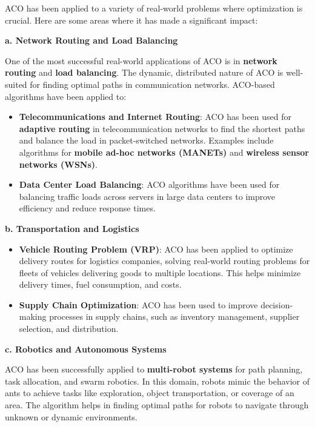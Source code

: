 \documentclass[
]{article}
\begin{document}
ACO has been applied to a variety of real-world problems where
optimization is crucial. Here are some areas where it has made a
significant impact:

\textbf{a. Network Routing and Load Balancing}

One of the most successful real-world applications of ACO is in
\textbf{network routing} and \textbf{load balancing}. The dynamic,
distributed nature of ACO is well-suited for finding optimal paths in
communication networks. ACO-based algorithms have been applied to:

\begin{itemize}
\item
  \textbf{Telecommunications and Internet Routing}: ACO has been used
  for \textbf{adaptive routing} in telecommunication networks to find
  the shortest paths and balance the load in packet-switched networks.
  Examples include algorithms for \textbf{mobile ad-hoc networks
  (MANETs)} and \textbf{wireless sensor networks (WSNs)}.
\item
  \textbf{Data Center Load Balancing}: ACO algorithms have been used for
  balancing traffic loads across servers in large data centers to
  improve efficiency and reduce response times.
\end{itemize}

\textbf{b. Transportation and Logistics}

\begin{itemize}
\item
  \textbf{Vehicle Routing Problem (VRP)}: ACO has been applied to
  optimize delivery routes for logistics companies, solving real-world
  routing problems for fleets of vehicles delivering goods to multiple
  locations. This helps minimize delivery times, fuel consumption, and
  costs.
\item
  \textbf{Supply Chain Optimization}: ACO has been used to improve
  decision-making processes in supply chains, such as inventory
  management, supplier selection, and distribution.
\end{itemize}

\textbf{c. Robotics and Autonomous Systems}

ACO has been successfully applied to \textbf{multi-robot systems} for
path planning, task allocation, and swarm robotics. In this domain,
robots mimic the behavior of ants to achieve tasks like exploration,
object transportation, or coverage of an area. The algorithm helps in
finding optimal paths for robots to navigate through unknown or dynamic
environments.
\end{document}
